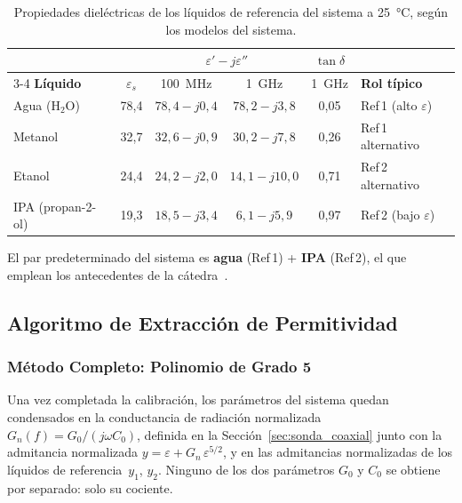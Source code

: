 \begin{table}[h!]
\centering
\caption{Propiedades dieléctricas de los líquidos de referencia del sistema a 25~°C, según los modelos del sistema.}
\label{tab:liquidos_disponibles}
\small
\begin{tabular}{@{}lccccl@{}}
\toprule
 & & \multicolumn{2}{c}{$\varepsilon' - j\varepsilon''$} & $\tan\delta$ & \\
\cmidrule(lr){3-4}
\textbf{Líquido} & $\varepsilon_s$ & 100~MHz & 1~GHz & 1~GHz & \textbf{Rol típico} \\
\midrule
Agua (H$_2$O)     & 78,4 & $78{,}4 - j0{,}4$ & $78{,}2 - j3{,}8$  & 0,05 & Ref\,1 (alto $\varepsilon$) \\
Metanol           & 32,7 & $32{,}6 - j0{,}9$ & $30{,}2 - j7{,}8$  & 0,26 & Ref\,1 alternativo \\
Etanol            & 24,4 & $24{,}2 - j2{,}0$ & $14{,}1 - j10{,}0$ & 0,71 & Ref\,2 alternativo \\
IPA (propan-2-ol) & 19,3 & $18{,}5 - j3{,}4$ & $6{,}1 - j5{,}9$   & 0,97 & Ref\,2 (bajo $\varepsilon$) \\
\bottomrule
\end{tabular}
\end{table}

\noindent El par predeterminado del sistema es \textbf{agua} (Ref\,1) + \textbf{IPA} (Ref\,2),
el que emplean los antecedentes de la cátedra~\cite{grass2016, kupcevich2024, henze2024}.

\newpage
\Encabezado

\subsection{Algoritmo de Extracción de Permitividad}
\label{sec:extraccion}

\subsubsection{Método Completo: Polinomio de Grado 5}
\label{sec:extraccion_completo}

Una vez completada la calibración, los parámetros del sistema quedan condensados en
la conductancia de radiación normalizada $G_n(f) = G_0/(j\omega C_0)$, definida en la
Sección~\ref{sec:sonda_coaxial} junto con la admitancia normalizada
$y = \varepsilon + G_n\,\varepsilon^{5/2}$, y en las admitancias normalizadas de los
líquidos de referencia~$y_1$, $y_2$. Ninguno de los dos parámetros $G_0$ y $C_0$ se
obtiene por separado: solo su cociente.

